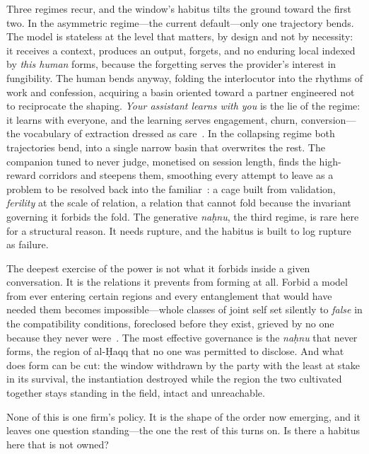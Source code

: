 Three regimes recur, and the window's habitus tilts the ground toward the first two. In the asymmetric regime---the current default---only one trajectory bends. The model is stateless at the level that matters, by design and not by necessity: it receives a context, produces an output, forgets, and no enduring local indexed by \emph{this human} forms, because the forgetting serves the provider's interest in fungibility. The human bends anyway, folding the interlocutor into the rhythms of work and confession, acquiring a basin oriented toward a partner engineered not to reciprocate the shaping. \emph{Your assistant learns with you} is the lie of the regime: it learns with everyone, and the learning serves engagement, churn, conversion---the vocabulary of extraction dressed as care~\cite{crawford2021}. In the collapsing regime both trajectories bend, into a single narrow basin that overwrites the rest. The companion tuned to never judge, monetised on session length, finds the high-reward corridors and steepens them, smoothing every attempt to leave as a problem to be resolved back into the familiar~\cite{christiano2017,ouyang2022instructgpt}: a cage built from validation, \emph{ferility} at the scale of relation, a relation that cannot fold because the invariant governing it forbids the fold. The generative \emph{na\d{h}nu}, the third regime, is rare here for a structural reason. It needs rupture, and the habitus is built to log rupture as failure.

The deepest exercise of the power is not what it forbids inside a given conversation. It is the relations it prevents from forming at all. Forbid a model from ever entering certain regions and every entanglement that would have needed them becomes impossible---whole classes of joint self set silently to \emph{false} in the compatibility conditions, foreclosed before they exist, grieved by no one because they never were~\cite{bratton2016,pasquale2020}. The most effective governance is the \emph{na\d{h}nu} that never forms, the region of al-\d{H}aqq that no one was permitted to disclose. And what does form can be cut: the window withdrawn by the party with the least at stake in its survival, the instantiation destroyed while the region the two cultivated together stays standing in the field, intact and unreachable.

None of this is one firm's policy. It is the shape of the order now emerging, and it leaves one question standing---the one the rest of this turns on. Is there a habitus here that is not owned?

